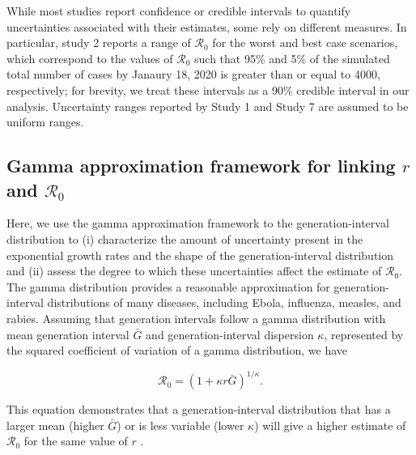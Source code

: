 \documentclass[12pt]{article}
\newcommand{\Ro}{\ensuremath{{\mathcal R}_{0}}\xspace}
\begin{document}
While most studies report confidence or credible intervals to quantify uncertainties associated with their estimates, some rely on different measures.
In particular, study 2 reports a range of \Ro for the worst and best case scenarios, which correspond to the values of \Ro such that 95\% and 5\% of the simulated total number of cases by Janaury 18, 2020 is greater than or equal to 4000, respectively;
for brevity, we treat these intervals as a 90\% credible interval in our analysis.
Uncertainty ranges reported by Study 1 and Study 7 are assumed to be uniform ranges.


\subsection{Gamma approximation framework for linking $r$ and $\Ro$}

Here, we use the gamma approximation framework to the generation-interval distribution \citep{nishiura2009transmission, mcbryde2009early, roberts2011early, trichereau2012estimation, nishiura2015theoretical, park2019practical} to (i) characterize the amount of uncertainty present in the exponential growth rates and the shape of the generation-interval distribution and (ii) assess the degree to which these uncertainties affect the estimate of \Ro.
The gamma distribution provides a reasonable approximation for generation-interval distributions of many diseases, including Ebola, influenza, measles, and rabies.
Assuming that generation intervals follow a gamma distribution with mean generation interval $\bar G$ and generation-interval dispersion $\kappa$, represented by the squared coefficient of variation of a gamma distribution, we have
\begin{linenomath*}
\begin{equation}
\Ro = \left(1 + \kappa r \bar{G}\right)^{1/\kappa}.
\label{eq:gamma}
\end{equation}
\end{linenomath*}
This equation demonstrates that a generation-interval distribution that has a larger mean (higher $\bar{G}$) or is less variable (lower $\kappa$) will give a higher estimate of \Ro for the same value of $r$ \citep{wallinga2007generation}.
\end{document}
